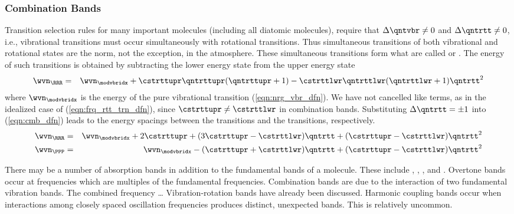 \documentclass[12pt]{article}
\begin{document}
\subsubsection[Combination Bands]{Combination Bands}\label{sxn:cmb}
Transition selection rules for many important molecules (including all
diatomic molecules), require that $\Delta \qntvbr \ne 0$ and $\Delta
\qntrtt \ne 0$, i.e., vibrational transitions must occur
simultaneously with rotational transitions.
Thus simultaneous transitions of both vibrational and rotational
states are the norm, not the exception, in the atmosphere.
These simultaneous transitions form what are called
 or .
The energy of such transitions is obtained by subtracting the 
lower energy state from the upper energy state
\begin{eqnarray}
\wvn_{\RRR} & = & \wvn_{\modvbridx} + 
\cstrttupr \qntrttupr (\qntrttupr + 1) -
\cstrttlwr \qntrttlwr (\qntrttlwr + 1) 
\qntrtt^{2}
\label{eqn:cmb_dfn}
\end{eqnarray}
where $\wvn_{\modvbridx}$ is the energy of the pure vibrational
transition (\ref{eqn:nrg_vbr_dfn}).
We have not cancelled like terms, as in the idealized case of
(\ref{eqn:frq_rtt_trn_dfn}), since $\cstrttupr \ne \cstrttlwr$ in
combination bands. 
Substituting $\Delta \qntrtt = \pm 1$ into (\ref{eqn:cmb_dfn}) leads
to the energy spacings between the  transitions 
and the  transitions, respectively.
\begin{eqnarray}
\wvn_{\RRR} & = & \wvn_{\modvbridx} + 2 \cstrttupr + 
(3\cstrttupr - \cstrttlwr) \qntrtt + (\cstrttupr - \cstrttlwr)
\qntrtt^{2} \\
\wvn_{\PPP} & = & \wvn_{\modvbridx} - (\cstrttupr + \cstrttlwr) \qntrtt 
+ (\cstrttupr - \cstrttlwr) \qntrtt^{2} 
\label{eqn:PR_dfn}
\end{eqnarray}

There may be a number of absorption bands in addition to the
fundamental bands of a molecule.
These include , ,
, and 
. 
Overtone bands occur at frequencies which are multiples of the
fundamental frequencies. 
Combination bands are due to the interaction of two fundamental
vibration bands.
The combined frequency \ldots
Vibration-rotation bands have already been discussed.
Harmonic coupling bands occur when interactions among closely spaced
oscillation frequencies produces distinct, unexpected bands.
This is relatively uncommon.
\end{document}

